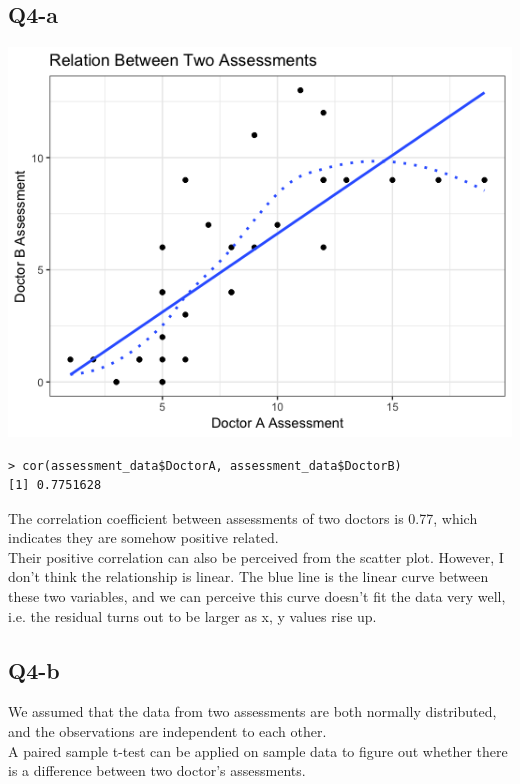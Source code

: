 \documentclass[12pt,letterpaper]{article}
\begin{document}
\subsection*{Q4-a}

\includegraphics[width=150mm]{hw2-q4.png}

\begin{verbatim}
> cor(assessment_data$DoctorA, assessment_data$DoctorB)
[1] 0.7751628
\end{verbatim}

\noindent The correlation coefficient between assessments of two doctors is 0.77,  which indicates they are somehow positive related. \\

\noindent Their positive correlation can also be perceived from the scatter plot. However, I don't think the relationship is linear. The blue line is the linear curve between these two variables, and we can perceive this curve doesn't fit the data very well, i.e. the residual turns out to be larger as x, y values rise up. 

\subsection*{Q4-b}

\noindent We assumed that the data from two assessments are both normally distributed, and the observations are independent to each other.\\

\noindent A paired sample t-test can be applied on sample data to figure out whether there is a difference between two doctor's assessments.  \\
\end{document}
